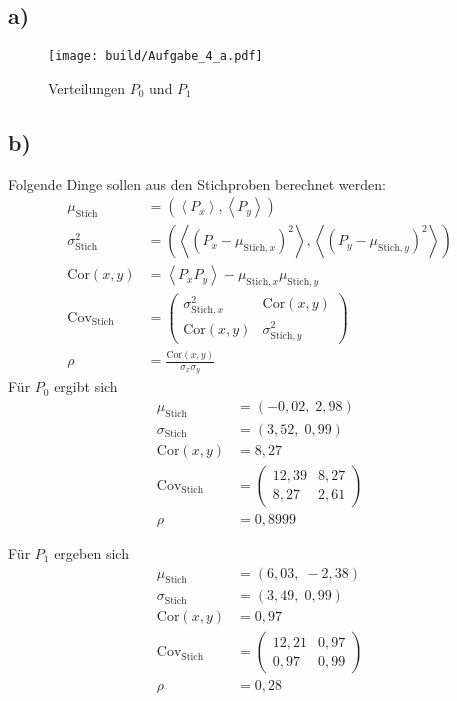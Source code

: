 \subsection{a)}
\begin{figure}
  \texttt{[image: build/Aufgabe\_4\_a.pdf]}
  \caption{Verteilungen $P_0$ und $P_1$}
  \label{fig:A4a}
\end{figure}


\subsection{b)}
Folgende Dinge sollen aus den Stichproben berechnet werden:
\begin{align}
  \mu_{\text{Stich}}         &=\left(\left\langle P_x\right\rangle,\left\langle P_y\right\rangle\right)\\
  \sigma_{\text{Stich}}^2    &=\left(\left\langle(P_x-\mu_{\text{Stich},x})^2\right\rangle,\left\langle(P_y-\mu_{\text{Stich},y})^2\right\rangle\right)\\
  \text{Cor}(x,y)            &=\left\langle P_xP_y\right\rangle-\mu_{\text{Stich},x}\mu_{\text{Stich},y}\\
  \text{Cov}_{\text{Stich}}  &=\left(
  \begin{array}{rr}
    \sigma_{\text{Stich},x}^2   & \text{Cor}(x,y)\\
    \text{Cor}(x,y)             & \sigma_{\text{Stich},y}^2
  \end{array}
                            \right)\\
  \rho                       &=\frac{\text{Cor}(x,y)}{\sigma_x\sigma_y}
\end{align}
Für $P_0$ ergibt sich
\begin{align}
  \mu_{\text{Stich}}         &=\left(-0,02,\; 2,98\right)\\
  \sigma_{\text{Stich}}      &=\left(3,52, \; 0,99\right)\\
  \text{Cor}(x,y)            &=8,27\\
  \text{Cov}_{\text{Stich}}  &=\left(
  \begin{array}{rr}
    12,39   & 8,27\\
    8,27    & 2,61
  \end{array}
                            \right)\\
  \rho                       &=0,8999
\end{align}

Für $P_1$ ergeben sich
\begin{align}
  \mu_{\text{Stich}}         &=\left(6,03,\;  -2,38\right)\\
  \sigma_{\text{Stich}}      &=\left(3,49,\;  0,99\right)\\
  \text{Cor}(x,y)            &=0,97\\
  \text{Cov}_{\text{Stich}}  &=\left(
  \begin{array}{rr}
    12,21   & 0,97\\
    0,97    & 0,99
  \end{array}
                            \right)\\
  \rho                       &=0,28
\end{align}

